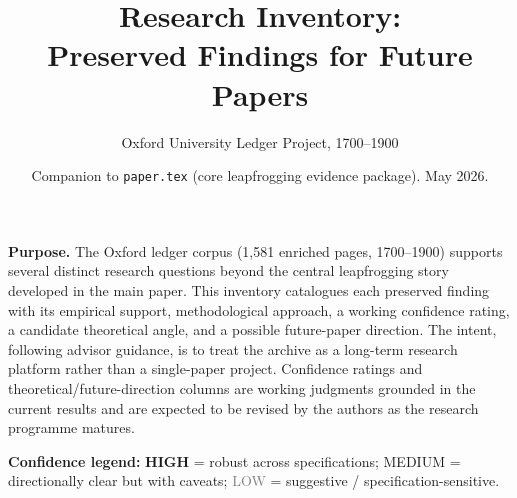 \documentclass[11pt]{article}
\title{\textbf{Research Inventory:\\ Preserved Findings for Future Papers}}
\author{Oxford University Ledger Project, 1700--1900}
\date{Companion to \texttt{paper.tex} (core leapfrogging evidence package). May 2026.}
\newcommand{\confhigh}[1]{\textcolor{green!45!black}{\textbf{#1}}}
\newcommand{\confmed}[1]{\textcolor{blue!55!black}{#1}}
\newcommand{\conflow}[1]{\textcolor{gray}{#1}}
\begin{document}
\maketitle

\noindent
\textbf{Purpose.} The Oxford ledger corpus (1{,}581 enriched pages, 1700--1900) supports several
distinct research questions beyond the central leapfrogging story developed in the main paper.
This inventory catalogues each preserved finding with its empirical support, methodological
approach, a working confidence rating, a candidate theoretical angle, and a possible future-paper
direction. The intent, following advisor guidance, is to treat the archive as a long-term research
platform rather than a single-paper project. Confidence ratings and theoretical/future-direction
columns are working judgments grounded in the current results and are expected to be revised by the
authors as the research programme matures.

\medskip
\noindent\textbf{Confidence legend:}\quad
\confhigh{HIGH} = robust across specifications;\quad
\confmed{MEDIUM} = directionally clear but with caveats;\quad
\conflow{LOW} = suggestive / specification-sensitive.

\bigskip
\end{document}
